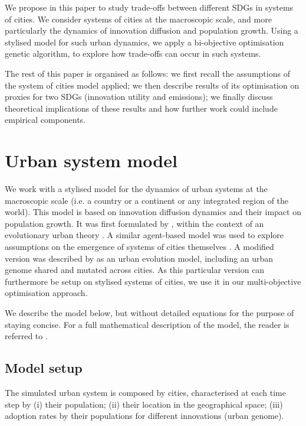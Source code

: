 \documentclass[final,5p,times,twocolumn,authoryear]{elsarticle}
\begin{document}
We propose in this paper to study trade-offs between different SDGs in systems of cities. We consider systems of cities at the macroscopic scale, and more particularly the dynamics of innovation diffusion and population growth. Using a stylised model for such urban dynamics, we apply a bi-objective optimisation genetic algorithm, to explore how trade-offs can occur in such systems.

The rest of this paper is organised as follows: we first recall the assumptions of the system of cities model applied; we then describe results of its optimisation on proxies for two SDGs (innovation utility and emissions); we finally discuss theoretical implications of these results and how further work could include empirical components.





\section{Urban system model}

We work with a stylised model for the dynamics of urban systems at the macroscopic scale (i.e. a country or a continent or any integrated region of the world). This model is based on innovation diffusion dynamics and their impact on population growth. It was first formulated by \cite{favaro2011gibrat}, within the context of an evolutionary urban theory \citep{pumain1997pour}. A similar agent-based model was used to explore assumptions on the emergence of systems of cities themselves \citep{schmitt2015half}. A modified version was described by \cite{raimbault2020model} as an urban evolution model, including an urban genome shared and mutated across cities. As this particular version can furthermore be setup on stylised systems of cities, we use it in our multi-objective optimisation approach.

We describe the model below, but without detailed equations for the purpose of staying concise. For a full mathematical description of the model, the reader is referred to \cite{raimbault2020model}.


\subsection{Model setup}

The simulated urban system is composed by cities, characterised at each time step by (i) their population; (ii) their location in the geographical space; (iii) adoption rates by their populations for different innovations (urban genome).
\end{document}
